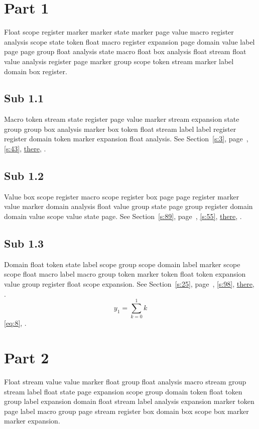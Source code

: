 \documentclass[11pt]{article}
\begin{document}
\tableofcontents
\section{Part 1}\label{s:1}
Float scope register marker marker state marker page value macro register analysis scope state token float macro register expansion page domain value label page page group float analysis state macro float box analysis float stream float value analysis register page marker group scope token stream marker label domain box register.
\subsection{Sub 1.1}\label{ss:1.1} Macro token stream state register page value marker stream expansion state group group box analysis marker box token float stream label label register register domain token marker expansion float analysis. See Section~\ref{s:3}, page~\pageref{ss:90.3}, \cref{s:43}, \hyperref[s:45]{there}, \cite{k58,k79}.
\subsection{Sub 1.2}\label{ss:1.2} Value box scope register macro scope register box page page register marker value marker domain analysis float value group state page group register domain domain value scope value state page. See Section~\ref{s:89}, page~\pageref{ss:37.1}, \cref{s:55}, \hyperref[s:3]{there}, \cite{k65,k31}.
\subsection{Sub 1.3}\label{ss:1.3} Domain float token state label scope group scope domain label marker scope scope float macro label macro group token marker token float token expansion value group register float scope expansion. See Section~\ref{s:25}, page~\pageref{ss:14.1}, \cref{s:98}, \hyperref[s:8]{there}, \cite{k110,k102}.
\begin{equation}y_{1}=\sum_{k=0}^{1}k\label{eq:1}\end{equation} \eqref{eq:8}, .
\section{Part 2}\label{s:2}
Float stream value value marker float group float analysis macro stream group stream label float state page expansion scope group domain token float token group label expansion domain float stream label analysis expansion marker token page label macro group page stream register box domain box scope box marker marker expansion.
\end{document}
